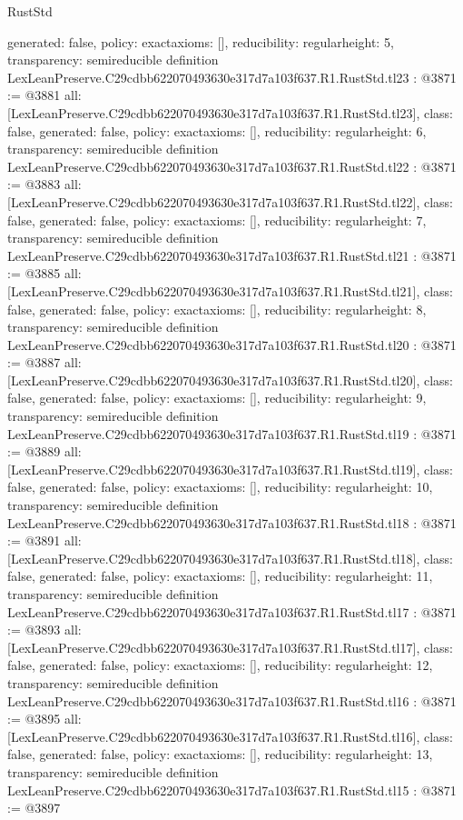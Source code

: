 \begin{lexlean}{RustStd}
\begin{coremodule}
{  generated: false,
  policy: exact{axioms: []},
  reducibility: regular{height: 5},
  transparency: semireducible
}
definition LexLeanPreserve.C29cdbb622070493630e317d7a103f637.R1.RustStd.tl23 : @3871 := @3881 {
  all: [LexLeanPreserve.C29cdbb622070493630e317d7a103f637.R1.RustStd.tl23],
  class: false,
  generated: false,
  policy: exact{axioms: []},
  reducibility: regular{height: 6},
  transparency: semireducible
}
definition LexLeanPreserve.C29cdbb622070493630e317d7a103f637.R1.RustStd.tl22 : @3871 := @3883 {
  all: [LexLeanPreserve.C29cdbb622070493630e317d7a103f637.R1.RustStd.tl22],
  class: false,
  generated: false,
  policy: exact{axioms: []},
  reducibility: regular{height: 7},
  transparency: semireducible
}
definition LexLeanPreserve.C29cdbb622070493630e317d7a103f637.R1.RustStd.tl21 : @3871 := @3885 {
  all: [LexLeanPreserve.C29cdbb622070493630e317d7a103f637.R1.RustStd.tl21],
  class: false,
  generated: false,
  policy: exact{axioms: []},
  reducibility: regular{height: 8},
  transparency: semireducible
}
definition LexLeanPreserve.C29cdbb622070493630e317d7a103f637.R1.RustStd.tl20 : @3871 := @3887 {
  all: [LexLeanPreserve.C29cdbb622070493630e317d7a103f637.R1.RustStd.tl20],
  class: false,
  generated: false,
  policy: exact{axioms: []},
  reducibility: regular{height: 9},
  transparency: semireducible
}
definition LexLeanPreserve.C29cdbb622070493630e317d7a103f637.R1.RustStd.tl19 : @3871 := @3889 {
  all: [LexLeanPreserve.C29cdbb622070493630e317d7a103f637.R1.RustStd.tl19],
  class: false,
  generated: false,
  policy: exact{axioms: []},
  reducibility: regular{height: 10},
  transparency: semireducible
}
definition LexLeanPreserve.C29cdbb622070493630e317d7a103f637.R1.RustStd.tl18 : @3871 := @3891 {
  all: [LexLeanPreserve.C29cdbb622070493630e317d7a103f637.R1.RustStd.tl18],
  class: false,
  generated: false,
  policy: exact{axioms: []},
  reducibility: regular{height: 11},
  transparency: semireducible
}
definition LexLeanPreserve.C29cdbb622070493630e317d7a103f637.R1.RustStd.tl17 : @3871 := @3893 {
  all: [LexLeanPreserve.C29cdbb622070493630e317d7a103f637.R1.RustStd.tl17],
  class: false,
  generated: false,
  policy: exact{axioms: []},
  reducibility: regular{height: 12},
  transparency: semireducible
}
definition LexLeanPreserve.C29cdbb622070493630e317d7a103f637.R1.RustStd.tl16 : @3871 := @3895 {
  all: [LexLeanPreserve.C29cdbb622070493630e317d7a103f637.R1.RustStd.tl16],
  class: false,
  generated: false,
  policy: exact{axioms: []},
  reducibility: regular{height: 13},
  transparency: semireducible
}
definition LexLeanPreserve.C29cdbb622070493630e317d7a103f637.R1.RustStd.tl15 : @3871 := @3897 {
}
\end{coremodule}
\end{lexlean}
